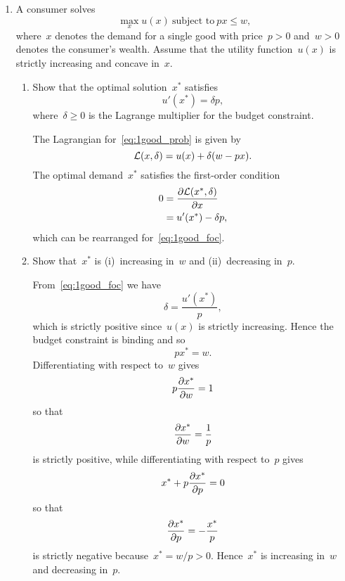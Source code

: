 
\begin{enumerate}

	\item
	A consumer solves
	\[ \max_xu(x)\ \text{subject to}\ px\le w, \label{eq:1good_prob} \]
	where~$x$ denotes the demand for a single good with price~$p>0$ and~$w>0$ denotes the consumer's wealth.
	Assume that the utility function~$u(x)$ is strictly increasing and concave in~$x$.
	\begin{enumerate}

		\item
		Show that the optimal solution~$x^*$ satisfies
		\[ u'(x^*)=\delta p, \label{eq:1good_foc} \]
		where~$\delta\ge0$ is the Lagrange multiplier for the budget constraint.
		\begin{solution}
			The Lagrangian for~\eqref{eq:1good_prob} is given by
			\[ \mathcal{L}(x,\delta)=u(x)+\delta(w-px). \]
			The optimal demand~$x^*$ satisfies the first-order condition
			\begin{align}
				0
				&= \frac{\partial\mathcal{L}(x^*,\delta)}{\partial x}\\
				&= u'(x^*)-\delta p,
			\end{align}
			which can be rearranged for~\eqref{eq:1good_foc}.
		\end{solution}

		\item
		Show that~$x^*$ is (i)~increasing in~$w$ and (ii)~decreasing in~$p$.
		\begin{solution}
			From~\eqref{eq:1good_foc} we have
			\[ \delta=\frac{u'(x^*)}{p}, \]
			which is strictly positive since~$u(x)$ is strictly increasing.
			Hence the budget constraint is binding and so
			\[ px^*=w. \]
			Differentiating with respect to~$w$ gives
			\[ p\frac{\partial x^*}{\partial w}=1 \]
			so that
			\[ \frac{\partial x^*}{\partial w}=\frac{1}{p} \]
			is strictly positive, while differentiating with respect to~$p$ gives
			\[ x^*+p\frac{\partial x^*}{\partial p}=0 \]
			so that
			\[ \frac{\partial x^*}{\partial p}=-\frac{x^*}{p} \]
			is strictly negative because~$x^*=w/p>0$.
			Hence~$x^*$ is increasing in~$w$ and decreasing in~$p$.
		\end{solution}


\end{enumerate}
\end{enumerate}
